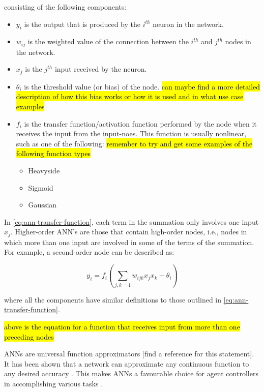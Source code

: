 consisting of the following components:
\begin{itemize}
	\item $y_i$ is the output that is produced by the $i^{th}$ neuron in the network.
	\item $w_{ij}$ is the weighted value of the connection between the $i^{th}$ and $j^{th}$ nodes in the network.
	\item $x_j$ is the $j^{th}$ input received by the neuron.
	\item $\theta_i$ is the threshold value (or bias) of the node. \hl{can maybe find a more detailed description of how this bias works or how it is used and in what use case examples}
	\item $f_i$ is the transfer function/activation function performed by the node when it receives the input from the input-noes. This function is usually nonlinear, such as one of the following: \hl{remember to try and get some examples of the following function types}
		\begin{itemize}
			\item Heavyside
			\item Sigmoid
			\item Gaussian
		\end{itemize}
\end{itemize}

In \ref{eq:ann-transfer-function}, each term in the summation only involves one input $x_j$. Higher-order ANN's are those that contain high-order nodes, i.e., nodes in which more than one input are involved in some of the terms of the summation. For example, a second-order node can be described as:

\begin{equation} \label{eq:higher-order-node}
	y_i = f_i (\sum_{{j,k}=1} w_{ijk}x_jx_k - \theta_i)
\end{equation}

where all the components have similar definitions to those outlined in \ref{eq:ann-transfer-function}.

\hl{above is the equation for a function that receives input from more than one preceding nodes}


ANNs are universal function approximators [find a reference for this statement]. It has been shown that a network can approximate any continuous function to any desired accuracy \cite{zhang1998forecasting}. This makes ANNs a favourable choice for agent controllers in accomplishing various tasks \cite{yegnanarayana2009artificial}.

